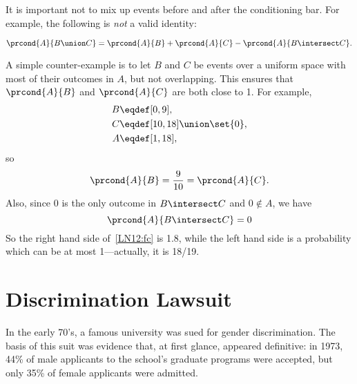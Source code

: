 It is important not to mix up events before and after the conditioning
bar.  For example, the following is \emph{not} a valid identity:
%
\begin{falseclm*}
\begin{equation}\label{LN12:fc}
\prcond{A}{B \union C} = \prcond{A}{B} + \prcond{A}{C} - \prcond{A}{B \intersect C}.
\end{equation}
\end{falseclm*}

A simple counter-example is to let $B$ and $C$ be events over a
uniform space with most of their outcomes in $A$, but not overlapping.
This ensures that $\prcond{A}{B}$ and $\prcond{A}{C}$ are both close
to 1.  For example,
\begin{align*}
B & \eqdef [0,9],\\
C & \eqdef [10,18] \union \set{0},\\
A & \eqdef [1,18],
\end{align*}
so
\[
\prcond{A}{B} = \frac{9}{10} = \prcond{A}{C}.
\]
Also, since 0 is the only outcome in $B \intersect C$ and $0 \notin
A$, we have
\[
\prcond{A}{B \intersect C} = 0
\]
So the right hand side of~\eqref{LN12:fc} is 1.8, while the left hand
side is a probability which can be at most 1---actually, it is 18/19.

\iffalse

A counterexample is shown in Figure~\ref{fig:15D2}.  In this case,
$\prcond{A}{B} = 1/2$, $\prcond{A}{C} = 1/2$, $\prcond{A}{B \intersect
  C} = 1$, and $\prcond{A}{B \union C} = 1/3$.  However, since
$1/3 \ne 1/2 + 1/2 - 1$, equation~\eqref{LN12:fc} does not hold.
%
\begin{figure}

\graphic{cx19}

\caption{A counterexample to equation~\eqref{LN12:fc}.  Event~$A$ is
  the dark-bordered rectangle, event~$B$ is the rectangle with
  vertical stripes, and event~$C$ is the rectangle with horizontal
  stripes.  $B \intersect C$ lies entirely within~$A$ while $B - C$
  and $C - B$ are entirely outside of~$A$.}

\label{fig:15D2}

\end{figure}
\fi

\section{Discrimination Lawsuit}\label{discrimination_subsec}

In the early 70's, a famous university was sued for gender
discrimination.  The basis of this suit was evidence that, at first
glance, appeared definitive: in 1973, 44\% of male applicants to the
school's graduate programs were accepted, but only 35\% of female
applicants were admitted.


